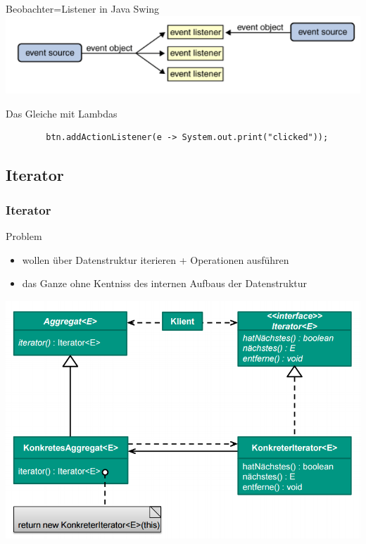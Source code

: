 \documentclass[18pt]{beamer}
\begin{document}
\begin{frame}[fragile]{Beobachter=Listener in Java Swing}
	\centering
	\includegraphics[scale=0.5]{pics/tut3/listener.png}
	\begin{block}{Das Gleiche mit Lambdas}
		\begin{verbatim}
		btn.addActionListener(e -> System.out.print("clicked"));
		\end{verbatim}
	\end{block}
\end{frame}

	\subsection{Iterator}
	\begin{frame}
		\frametitle{Iterator}
		\begin{block}{Problem}
			\begin{itemize}
				\item wollen über Datenstruktur iterieren + Operationen ausführen \pause
				\item das Ganze ohne Kentniss des internen Aufbaus der Datenstruktur 
			\end{itemize}
		\end{block}
		\pause
		\centering
		\includegraphics[scale=0.35]{./pics/tut3/iter.png}
	\end{frame}
\end{document}
